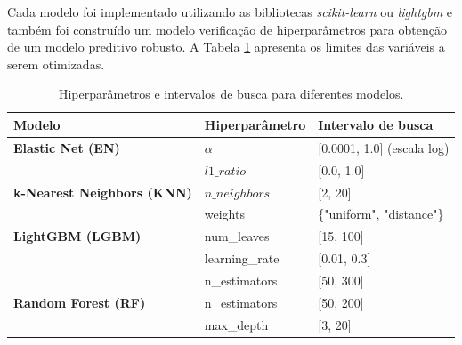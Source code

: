 Cada modelo foi implementado utilizando as bibliotecas \textit{scikit-learn} ou \textit{lightgbm} e também foi construído um modelo verificação de hiperparâmetros para obtenção de um modelo preditivo robusto. A Tabela \ref{tab:modelos_aprendizado} apresenta os limites das variáveis a serem otimizadas.

\begin{table}[H]
\centering
\caption{Hiperparâmetros e intervalos de busca para diferentes modelos.}
\label{tab:modelos_aprendizado}
\begin{tabularx}{\textwidth}{p{6cm} p{4cm} X}
\toprule
\textbf{Modelo} & \textbf{Hiperparâmetro} & \textbf{Intervalo de busca} \\ 
\midrule

\textbf{Elastic Net (EN)} & $\alpha$ & {[}0.0001, 1.0{]} (escala log) \\[2pt]
 & $l1\_ratio$ & {[}0.0, 1.0{]} \\[6pt]

\textbf{k-Nearest Neighbors (KNN)} & $n\_neighbors$ & {[}2, 20{]} \\[2pt]
 & weights & \{"uniform", "distance"\} \\[6pt]

\textbf{LightGBM (LGBM)} & num\_leaves & {[}15, 100{]} \\[2pt]
 & learning\_rate & {[}0.01, 0.3{]} \\[2pt]
 & n\_estimators & {[}50, 300{]} \\[6pt]

\textbf{Random Forest (RF)} & n\_estimators & {[}50, 200{]} \\[2pt]
 & max\_depth & {[}3, 20{]} \\

\bottomrule
\end{tabularx}
\vspace{0.2cm}
\end{table}



